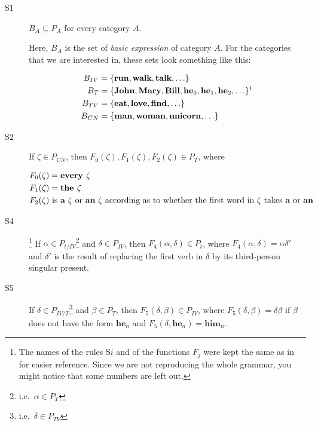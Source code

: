 \begin{description}
\item[S1] $B_A \subseteq P_A$ for every category $A$.

  Here, $B_A$ is the set of \emph{basic expression} of category $A$. For
  the categories that we are interested in, these sets look something like
  this:

  \begin{align*}
    B_{IV} &= \{ \textbf{run}, \textbf{walk}, \textbf{talk}, \ldots \} \\
    B_{T} &= \{ \textbf{John}, \textbf{Mary}, \textbf{Bill}, \textbf{he}_0,
            \textbf{he}_1, \textbf{he}_2, \ldots \}\footnotemark \\
    B_{TV} &= \{ \textbf{eat}, \textbf{love}, \textbf{find}, \ldots \} \\
    B_{CN} &= \{ \textbf{man}, \textbf{woman}, \textbf{unicorn}, \ldots \}
  \end{align*}


\item[S2] If $\zeta \in P_{CN}$, then
  $F_0(\zeta), F_1(\zeta), F_2(\zeta) \in P_{T}$, where

  \begin{align*}
    F_0(\zeta) &= \textbf{every } \zeta \\
    F_1(\zeta) &= \textbf{the } \zeta \\
    F_2(\zeta) &\text{ is \textbf{a} $\zeta$ or \textbf{an} $\zeta$ according
    as to whether the first word in $\zeta$ takes \textbf{a} or \textbf{an}}
  \end{align*}

\item[S4]\footnote{The names of the rules S$i$ and of the functions $F_j$
    were kept the same as in~\cite{montague1973proper} for easier
    reference. Since we are not reproducing the whole grammar, you might
    notice that some numbers are left out.} If
  $\alpha \in P_{t / IV}$\footnote{i.e.\ $\alpha \in P_{T}$} and
  $\delta \in P_{IV}$, then $F_4(\alpha, \delta) \in P_{t}$, where
  $F_4(\alpha, \delta) = \alpha \delta'$ and $\delta'$ is the result of
  replacing the first verb in $\delta$ by its third-person singular
  present.

\item[S5] If $\delta \in P_{IV / T}$\footnote{i.e.\ $\delta \in P_{TV}$}
  and $\beta \in P_{T}$, then $F_5(\delta, \beta) \in P_{IV}$, where
  $F_5(\delta, \beta) = \delta \beta$ if $\beta$ does not have the form
  $\textbf{he}_n$ and $F_5(\delta, \textbf{he}_n) = \textbf{him}_n$.


\end{description}
